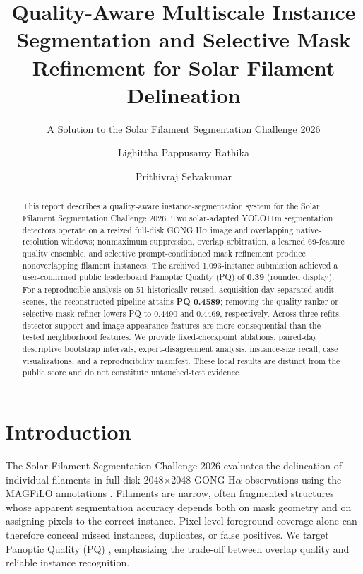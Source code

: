 \documentclass[sigconf]{acmart}
\begin{document}
\title[Quality-Aware Solar Filament Segmentation]{Quality-Aware Multiscale Instance Segmentation and Selective Mask Refinement for Solar Filament Delineation}
\subtitle{A Solution to the Solar Filament Segmentation Challenge 2026}
\author{Lighittha Pappusamy Rathika}
\author{Prithivraj Selvakumar}
\renewcommand{\shortauthors}{Rathika and Selvakumar}
\begin{abstract}
This report describes a quality-aware instance-segmentation system for the Solar Filament Segmentation Challenge 2026. Two solar-adapted YOLO11m segmentation detectors operate on a resized full-disk GONG H$\alpha$ image and overlapping native-resolution windows; nonmaximum suppression, overlap arbitration, a learned 69-feature quality ensemble, and selective prompt-conditioned mask refinement produce nonoverlapping filament instances. The archived 1,093-instance submission achieved a user-confirmed public leaderboard Panoptic Quality (PQ) of \textbf{0.39} (rounded display). For a reproducible analysis on 51 historically reused, acquisition-day-separated audit scenes, the reconstructed pipeline attains \textbf{PQ 0.4589}; removing the quality ranker or selective mask refiner lowers PQ to 0.4490 and 0.4469, respectively. Across three refits, detector-support and image-appearance features are more consequential than the tested neighborhood features. We provide fixed-checkpoint ablations, paired-day descriptive bootstrap intervals, expert-disagreement analysis, instance-size recall, case visualizations, and a reproducibility manifest. These local results are distinct from the public score and do not constitute untouched-test evidence.
\end{abstract}
\maketitle
\section{Introduction}
The Solar Filament Segmentation Challenge 2026 \cite{filament-segmentation-2026} evaluates the delineation of individual filaments in full-disk 2048$\times$2048 GONG H$\alpha$ observations using the MAGFiLO annotations \cite{ahmadzadeh2024dataset}. Filaments are narrow, often fragmented structures whose apparent segmentation accuracy depends both on mask geometry and on assigning pixels to the correct instance. Pixel-level foreground coverage alone can therefore conceal missed instances, duplicates, or false positives. We target Panoptic Quality (PQ) \cite{kirillov2019}, emphasizing the trade-off between overlap quality and reliable instance recognition.
\end{document}
